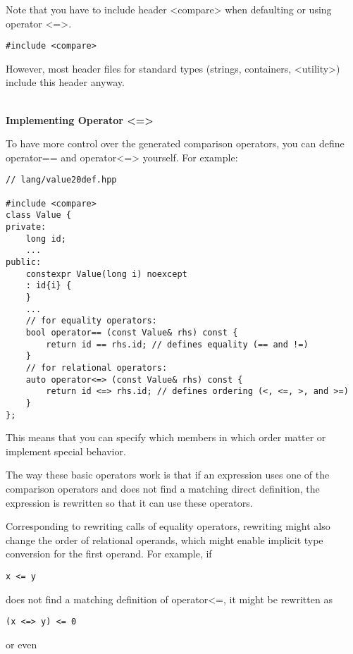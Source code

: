 Note that you have to include header <compare> when defaulting or using operator <=>.

\begin{lstlisting}[style=styleCXX]
#include <compare>
\end{lstlisting}

However, most header files for standard types (strings, containers, <utility>) include this header anyway.

\noindent
\hspace*{\fill} \\ %
\textbf{Implementing Operator <=>}

To have more control over the generated comparison operators, you can define operator== and operator<=> yourself. For example:

\begin{lstlisting}[style=styleCXX]
// lang/value20def.hpp

#include <compare>
class Value {
private:
	long id;
	...
public:
	constexpr Value(long i) noexcept
	: id{i} {
	}
	...
	// for equality operators:
	bool operator== (const Value& rhs) const {
		return id == rhs.id; // defines equality (== and !=)
	}
	// for relational operators:
	auto operator<=> (const Value& rhs) const {
		return id <=> rhs.id; // defines ordering (<, <=, >, and >=)
	}
};
\end{lstlisting}

This means that you can specify which members in which order matter or implement special behavior.

The way these basic operators work is that if an expression uses one of the comparison operators and does not find a matching direct definition, the expression is rewritten so that it can use these operators.

Corresponding to rewriting calls of equality operators, rewriting might also change the order of relational operands, which might enable implicit type conversion for the first operand. For example, if

\begin{lstlisting}[style=styleCXX]
x <= y
\end{lstlisting}

does not find a matching definition of operator<=, it might be rewritten as

\begin{lstlisting}[style=styleCXX]
(x <=> y) <= 0
\end{lstlisting}

or even

